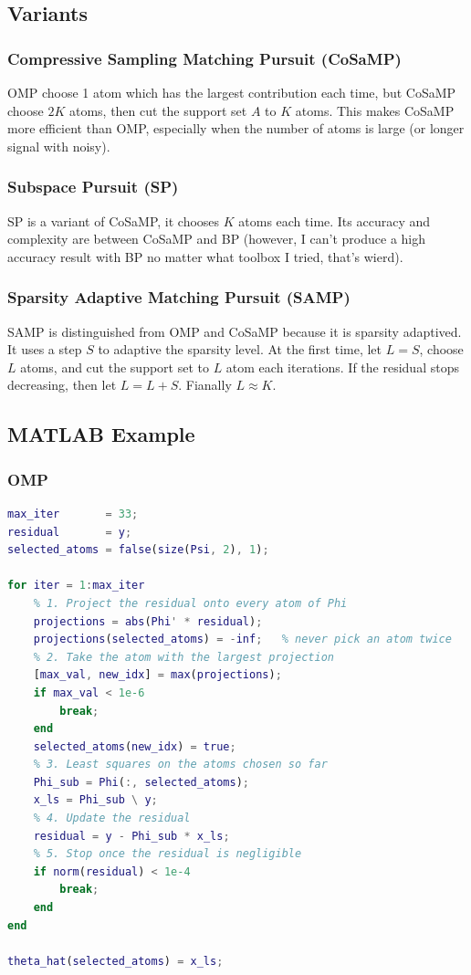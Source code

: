\documentclass[10pt,a4paper,oneside,numbers=noenddot]{scrbook}
\theoremstyle{ctplain}
\theoremstyle{ctresult}
\begin{document}
\subsection{Variants}

\subsubsection{Compressive Sampling Matching Pursuit (CoSaMP)}
OMP choose 1 atom which has the largest contribution each time, but CoSaMP choose
$2K$ atoms, then cut the support set $A$ to $K$ atoms. This makes CoSaMP more
efficient than OMP, especially when the number of atoms is large (or longer
signal with noisy).

\subsubsection{Subspace Pursuit (SP)}
SP is a variant of CoSaMP, it chooses $K$ atoms each time. Its accuracy and complexity
are between CoSaMP and BP (however, I can't produce a high accuracy result with BP no
matter what toolbox I tried, that's wierd).

\subsubsection{Sparsity Adaptive Matching Pursuit (SAMP)}
SAMP is distinguished from OMP and CoSaMP because it is sparsity adaptived. It
uses a step $S$ to adaptive the sparsity level. At the first time, let $L = S$,
choose $L$ atoms, and cut the support set to $L$ atom each iterations. If the
residual stops decreasing, then let $L = L + S$. Fianally $L \approx K$.

\subsection{MATLAB Example}

\subsubsection{OMP}
\begin{lstlisting}[language=Matlab]
max_iter       = 33;
residual       = y;
selected_atoms = false(size(Psi, 2), 1);

for iter = 1:max_iter
    % 1. Project the residual onto every atom of Phi
    projections = abs(Phi' * residual);
    projections(selected_atoms) = -inf;   % never pick an atom twice
    % 2. Take the atom with the largest projection
    [max_val, new_idx] = max(projections);
    if max_val < 1e-6
        break;
    end
    selected_atoms(new_idx) = true;
    % 3. Least squares on the atoms chosen so far
    Phi_sub = Phi(:, selected_atoms);
    x_ls = Phi_sub \ y;
    % 4. Update the residual
    residual = y - Phi_sub * x_ls;
    % 5. Stop once the residual is negligible
    if norm(residual) < 1e-4
        break;
    end
end

theta_hat(selected_atoms) = x_ls;
\end{lstlisting}
\end{document}
